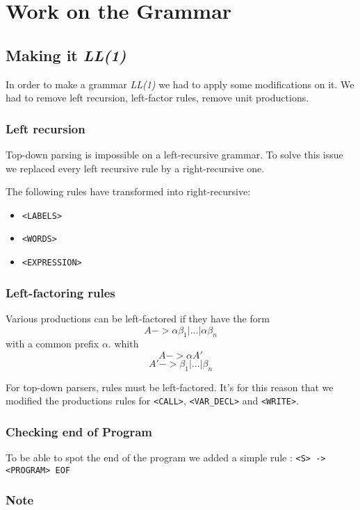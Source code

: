 \newpage\cleardoublepage{}
\section{Work on the Grammar}


\subsection{Making it \emph{LL(1)}}
In order to make a grammar \emph{LL(1)} we had to apply some modifications on it. We had to remove left recursion, left-factor rules, remove unit productions.

\subsubsection{Left recursion}

Top-down parsing is impossible on a left-recursive grammar. To solve this issue we replaced every left recursive rule by a right-recursive one.

The following rules have transformed into right-recursive:
\begin{itemize}
	\item \verb!<LABELS>!
	\item \verb!<WORDS>!
	\item \verb!<EXPRESSION>!
\end{itemize}


\subsubsection{Left-factoring rules}
Various productions can be left-factored if they have the form
$$A -> \alpha \beta_{1} | ... | \alpha\beta_{n}$$
with a common prefix $\alpha$.
whith
$$A -> \alpha A'$$
$$A' -> \beta_{1} | ... | \beta_{n}$$

For top-down parsers, rules must be left-factored.
It's for this reason that we modified the productions rules for
\verb!<CALL>!, \verb!<VAR_DECL>! and \verb!<WRITE>!.


\subsubsection{Checking end of Program}

To be able to spot the end of the program we added a simple rule :
\verb!<S> -> <PROGRAM> EOF!

\subsubsection{Note}

